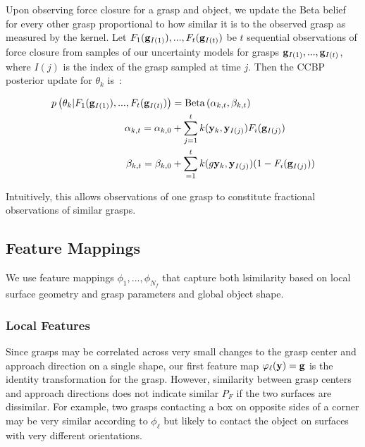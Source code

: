 Upon observing force closure for a grasp and object, we update the Beta belief for every other grasp proportional to how similar it is to the observed grasp as measured by the kernel. 
Let $F_{1}(\mathbf{g}_{I(1)}), ..., F_{t}(\mathbf{g}_{I(t)})$ be $t$ sequential observations of force closure from samples of our uncertainty models for grasps $\mathbf{g}_{I(1)}, ..., \mathbf{g}_{I(t)}$, where $I(j)$ is the index of the grasp sampled at time $j$.
Then the CCBP posterior update for $\theta_k$ is~\cite{goetschalckx2011continuous}:

\vspace{-2ex}
\begin{align}
	p \left(\theta_k | F_{1}(\mathbf{g}_{I(1)}), ..., F_{t}(\mathbf{g}_{I(t)}) \right) &= \text{Beta}\left( \alpha_{k,t}, \beta_{k,t} \right) \notag \\
	\alpha_{k,t} = \alpha_{k,0} &+ \sum \limits_{j=1}^t k(\mathbf{y}_k, \mathbf{y}_{I(j)}) F_{i}(\mathbf{g}_{I(j)}) \label{eq:alpha} \\
	\beta_{k,t} = \beta_{k,0} &+ \sum \limits_{=1}^t k(g\mathbf{y}_k, \mathbf{y}_{I(j)}) (1 - F_{i}(\mathbf{g}_{I(j)})) \label{eq:beta}
\end{align}

\noindent Intuitively, this allows observations of one grasp to constitute fractional observations of similar grasps.

\subsection{Feature Mappings}
We use feature mappings $\phi_1, ..., \phi_{N_f}$ that capture both lsimilarity based on local surface geometry and grasp parameters and global object shape.

\subsubsection{Local Features}
Since grasps may be correlated across very small changes to the grasp center and approach direction on a single shape, our first feature map $\varphi_{\ell}(\mathbf{y}) = \mathbf{g}$ is the identity transformation for the grasp.
However, similarity between grasp centers and approach directions does not indicate similar $P_F$ if the two surfaces are dissimilar.
For example, two grasps contacting a box on opposite sides of a corner may be very similar according to $\phi_{\ell}$ but likely to contact the object on surfaces with very different orientations.

